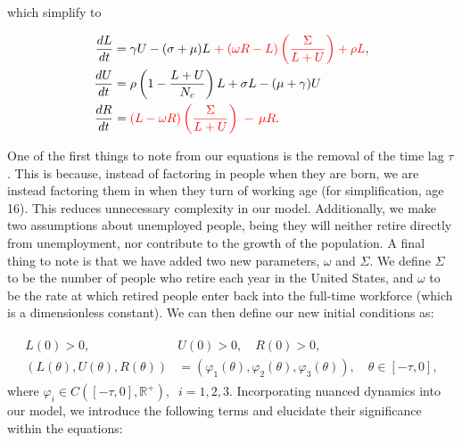 \documentclass[11pt]{amsart}
\begin{document}
which simplify to 

\begin{align}
    \begin{split}
        \frac{dL}{dt} &= \gamma U - (\sigma + \mu)L {\color{red}\; + \;(\omega R - L)\left(\frac{\Sigma}{L + U}\right) + \rho L},\\
        \frac{dU}{dt} &= \rho\left(1 - \frac{L + U}{N_c} \right)L + \sigma L -(\mu + \gamma)U  \\
        \frac{dR}{dt} &= {\color{red}(L - \omega R)\left(\frac{\Sigma}{L + U}\right) \; - \, \mu R}.
    \end{split}
\end{align}

One of the first things to note from our equations is the removal of the time lag $\tau$. 
This is because, instead of factoring in people when they are born, we are instead factoring them
in when they turn of working age (for simplification, age 16). This reduces unnecessary complexity in our model. 
Additionally, we make two assumptions about unemployed people, being they will
neither retire directly from unemployment, nor contribute to the growth of the population. A final thing to note
is that we have added two new parameters, $\omega$ and $\Sigma$. We define $\Sigma$ to be the number of people who
retire each year in the United States, and $\omega$ to be the rate at which retired people enter back
into the full-time workforce (which is a dimensionless constant). We can then define our new initial conditions as:

\begin{align}
    \begin{split}
        L(0) > 0, \quad &U(0) > 0, \quad R(0) > 0, \\
        (L(\theta),U(\theta), R(\theta)) &= (\varphi_1(\theta), \varphi_2(\theta), \varphi_3(\theta)), \quad \theta \in [-\tau,0],
    \end{split}
\end{align}
where $\varphi_i\in C([-\tau, 0], \mathbb{R}^+),\;\; i=1,2,3$. Incorporating nuanced dynamics into our model, we introduce the following terms and elucidate their significance within the equations:

\end{document}
